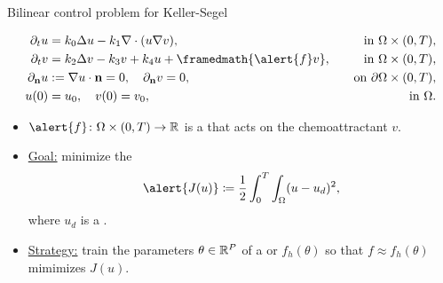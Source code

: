 \begin{frame}{Bilinear control problem for Keller-Segel}
  \small
  \begin{block}{}
  \vspace*{-0.5cm}
  \begin{subequations}
      \begin{align*}
      \partial_t u&=k_0\Delta u-k_1\nabla\cdot(u\nabla v),\quad&\text{in }\Omega\times (0,T),\\
      \partial_t v&=k_2\Delta v-k_3v+k_4u + \framedmath{\alert{f} v},\quad&\text{in }\Omega\times (0,T),\\
      \partial_\mathbf{n}u& :=\nabla u\cdot \mathbf{n}=0,\quad
      \partial_\mathbf{n} v 
      =0, \quad &\text{on }\partial\Omega\times (0,T),\\
      u(0)&=u_0,\quad v(0)=v_0
      ,\quad&\text{in }\Omega.%
      \end{align*}
  \end{subequations}
  \end{block}

  \begin{itemize}
    \item $\alert{f}\colon\Omega\times (0,T)\to \mathbb{R}$ is a  that acts on the chemoattractant $v$.
    \item \underline{Goal:} minimize the  $$\alert{J(u)}\coloneq\frac{1}{2}\int_0^T\int_\Omega (u-u_d)^2,$$ where \alert{$u_d$} is a .
    \item \underline{Strategy:} train the parameters $\theta\in \mathbb{R}^P$ of a  or  $f_h(\theta)$ so that \alert{$f\approx f_h(\theta)$ mimimizes $J(u)$}.
  \end{itemize}
\end{frame}

